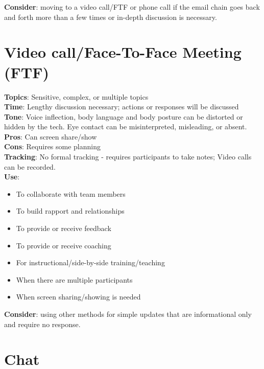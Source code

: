 \documentclass[
  letterpaper,
  DIV=11,
  numbers=noendperiod]{scrreprt}
\providecommand{\tightlist}{%
  \setlength{\itemsep}{0pt}\setlength{\parskip}{0pt}}\usepackage{longtable,booktabs,array}
\begin{document}
\textbf{Consider}: moving to a video call/FTF or phone call if the email
chain goes back and forth more than a few times or in-depth discussion
is necessary.

\hypertarget{video-callface-to-face-meeting-ftf}{%
\section{Video call/Face-To-Face Meeting
(FTF)}\label{video-callface-to-face-meeting-ftf}}

\textbf{Topics}: Sensitive, complex, or multiple topics\\
\textbf{Time}: Lengthy discussion necessary; actions or responses will
be discussed\\
\textbf{Tone}: Voice inflection, body language and body posture can be
distorted or hidden by the tech. Eye contact can be misinterpreted,
misleading, or absent.\\
\textbf{Pros}: Can screen share/show\\
\textbf{Cons}: Requires some planning\\
\textbf{Tracking}: No formal tracking - requires participants to take
notes; Video calls can be recorded.\\
\textbf{Use}:

\begin{itemize}
\tightlist
\item
  To collaborate with team members\\
\item
  To build rapport and relationships\\
\item
  To provide or receive feedback\\
\item
  To provide or receive coaching\\
\item
  For instructional/side-by-side training/teaching\\
\item
  When there are multiple participants\\
\item
  When screen sharing/showing is needed
\end{itemize}

\textbf{Consider}: using other methods for simple updates that are
informational only and require no response.

\hypertarget{chat}{%
\section{Chat}\label{chat}}
\end{document}
